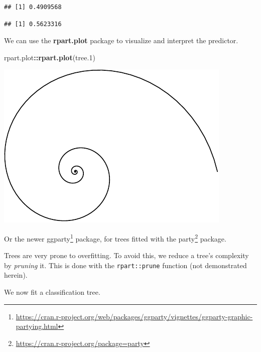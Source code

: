\documentclass[]{book}
\newenvironment{Shaded}{\begin{snugshade}}{\end{snugshade}}
\newcommand{\CommentTok}[1]{\textcolor[rgb]{0.56,0.35,0.01}{\textit{#1}}}
\newcommand{\DataTypeTok}[1]{\textcolor[rgb]{0.13,0.29,0.53}{#1}}
\newcommand{\FloatTok}[1]{\textcolor[rgb]{0.00,0.00,0.81}{#1}}
\newcommand{\KeywordTok}[1]{\textcolor[rgb]{0.13,0.29,0.53}{\textbf{#1}}}
\newcommand{\NormalTok}[1]{#1}
\newcommand{\OperatorTok}[1]{\textcolor[rgb]{0.81,0.36,0.00}{\textbf{#1}}}
\newcommand{\StringTok}[1]{\textcolor[rgb]{0.31,0.60,0.02}{#1}}
\renewcommand{\href}[2]{#2\footnote{\url{#1}}}
\theoremstyle{definition}
\theoremstyle{definition}
\theoremstyle{definition}
\theoremstyle{remark}
\begin{document}
\begin{verbatim}
## [1] 0.4909568
\end{verbatim}

\begin{Shaded}
\end{Shaded}

\begin{verbatim}
## [1] 0.5623316
\end{verbatim}

We can use the \textbf{rpart.plot} package to visualize and interpret the predictor.

\begin{Shaded}
\begin{Highlighting}[]
\NormalTok{rpart.plot}\OperatorTok{::}\KeywordTok{rpart.plot}\NormalTok{(tree}\FloatTok{.1}\NormalTok{)}
\end{Highlighting}
\end{Shaded}

\includegraphics[width=0.5\linewidth]{Rcourse_files/figure-latex/unnamed-chunk-227-1}

Or the newer \href{https://cran.r-project.org/web/packages/ggparty/vignettes/ggparty-graphic-partying.html}{ggparty} package, for trees fitted with the \href{https://cran.r-project.org/package=party}{party} package.

Trees are very prone to overfitting.
To avoid this, we reduce a tree's complexity by \emph{pruning} it.
This is done with the \texttt{rpart::prune} function (not demonstrated herein).

We now fit a classification tree.
\end{document}

